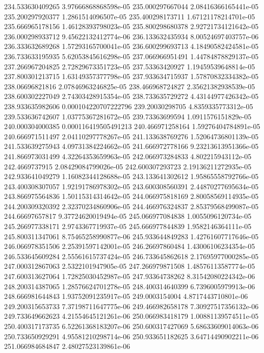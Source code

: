 {234.533630409265 3.97666868868598e-05
235.000297667044 2.08416366165441e-05
235.200297920377 1.2861514096507e-05
235.400298173711 1.67121178214701e-05
235.666965178156 1.46128393798023e-05
235.800298680378 2.92721734121642e-05
236.000298933712 9.45622132412774e-06
236.133632435934 8.00524697403757e-06
236.333632689268 1.57293165700041e-05
236.600299693713 4.18490582424581e-05
236.733633195935 5.62053845616298e-05
237.066966951491 1.44784878829137e-05
237.266967204825 2.72829673351723e-05
237.53363420927 1.19459539648814e-05
237.800301213715 1.63149357377798e-05
237.933634715937 1.57870832334382e-05
238.06696821816 2.07846963246825e-05
238.466968724827 2.35621382938539e-05
238.600302227049 2.74303428915354e-05
238.733635729272 4.43144977426342e-05
238.933635982606 0.000104220707222796
239.20030298705 4.8359335773312e-05
239.533636742607 1.03775367281672e-05
239.73363699594 1.0911576151829e-05
240.000304000385 0.000116419505491213
240.466971258164 1.59276404784891e-05
240.666971511497 2.04110297778267e-05
241.133638769276 1.52064736801139e-05
241.533639275943 4.09731384224662e-05
241.666972778166 9.23213613951366e-05
241.866973031499 4.32264353659963e-05
242.066973284833 4.802215943112e-05
242.4669737915 2.08429084799026e-05
242.600307293723 2.19136211272935e-05
242.933641049279 1.16082344128688e-05
243.133641302612 1.95865558792766e-05
243.400308307057 1.92191786978302e-05
243.600308560391 2.44870277695634e-05
243.866975564836 1.50115314314642e-05
244.066975818169 2.80058569114935e-05
244.200309320392 2.32370234860906e-05
244.466976324837 2.85379568499087e-05
244.66697657817 9.37724620019494e-05
245.066977084838 1.0055096120734e-05
245.266977338171 2.9743367719937e-05
245.666977844839 1.9582146364111e-05
245.800311347061 8.75465258990877e-06
245.933644849283 1.42761607717646e-05
246.066978351506 2.25391597142001e-05
246.26697860484 1.43006106234354e-05
246.533645609284 2.55561615737424e-05
246.733645862618 2.17695977000285e-05
247.000312867063 2.5322101947905e-05
247.266979871508 1.48576113587774e-05
247.600313627064 1.72825030452987e-05
247.93364738262 8.31542080224342e-06
248.200314387065 1.28576624701278e-05
248.400314640399 6.7396005979913e-06
248.666981644843 1.93752091235917e-05
249.0003154004 4.8717443710801e-06
249.200315653733 7.37198711647775e-06
249.466982658178 7.30927517356132e-06
249.733649662623 4.21554645121261e-06
250.066983418179 1.00881139574511e-05
250.400317173735 6.52261368183207e-06
250.600317427069 5.68633609014063e-06
250.733650929291 4.95581210298714e-06
250.933651182625 3.64714490902211e-06
251.066984684847 2.48027523139861e-06
}
